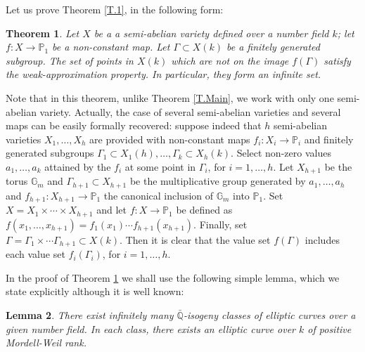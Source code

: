 \documentclass[leqno,12pt]{article} %
\def\Q{{{\mathbb Q}}}
\def\P{{{\mathbb P}}}
\def\G{{{\mathbb G}}}
\theoremstyle{plain} %
\newtheorem{theorem}{\indent\sc Theorem}[section]
\newtheorem{lemma}[theorem]{\indent\sc Lemma}
\theoremstyle{definition} %
\begin{document}
Let us prove Theorem \ref{T.1}, in the following form:

\begin{theorem}\label{T.Main2}
Let $X$ be a a semi-abelian variety defined over a number field $k$; let $f:X\to \P_1$ be a non-constant map. Let $\Gamma\subset X(k)$ be a finitely generated subgroup. The set of points in $X(k)$ which are not on the image $f(\Gamma)$ satisfy the weak-approximation property. In particular, they form an infinite set.  
\end{theorem}

Note that in  this theorem, unlike  Theorem \ref{T.Main}, we work with only one semi-abelian variety. Actually, the case of several semi-abelian varieties and several maps can be easily formally recovered: suppose indeed that $h$ semi-abelian varieties $X_1,\ldots,X_h$ are provided  with non-constant maps $f_i:X_i\to \P_i$ and finitely generated subgroups $\Gamma_1\subset X_1(h),\ldots, \Gamma_k\subset X_h(k)$. Select non-zero values $a_1,\ldots,a_k$ attained by the $f_i$ at some point in $\Gamma_i$, for $i=1,\ldots,h$. Let $X_{h+1}$ be the torus $\G_m$ and $\Gamma_{h+1}\subset X_{h+1}$ be the multiplicative group generated by $a_1,\ldots,a_h$ and $f_{h+1}:X_{h+1}\to \P_1$ the canonical inclusion of $\G_m$ into $\P_1$. 
Set $X=X_1\times\cdots \times X_{h+1}$ and let $f:X\to \P_1$ be defined as $f(x_1,\ldots,x_{h+1})=f_1(x_1)\cdots f_{h+1}(x_{h+1})$. 
Finally, set $\Gamma=\Gamma_1\times\cdots \Gamma_{h+1}\subset X(k)$. Then it is clear that the value set  $f(\Gamma)$ includes each value set $f_i(\Gamma_i)$, for $i=1,\ldots,h$.


\medskip

In the proof of Theorem \ref{T.Main2} we shall use the following simple lemma, which we state explicitly although  it is well known:

\begin{lemma}
There exist  infinitely many $\bar{\Q}$-isogeny classes of elliptic curves over a given number field. In each class, there exists an elliptic curve over $k$ of positive Mordell-Weil rank.
\end{lemma}
 
\end{document}
